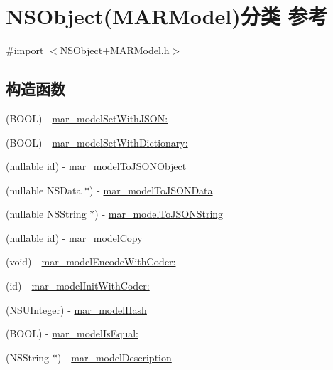 \hypertarget{category_n_s_object_07_m_a_r_model_08}{}\section{N\+S\+Object(M\+A\+R\+Model)分类 参考}
\label{category_n_s_object_07_m_a_r_model_08}


{\ttfamily \#import $<$N\+S\+Object+\+M\+A\+R\+Model.\+h$>$}

\subsection*{构造函数}
\begin{DoxyCompactItemize}
\item 
(B\+O\+OL) -\/ \hyperlink{category_n_s_object_07_m_a_r_model_08_a4c2e8b36fb2a53b588010cdff2b42e72}{mar\+\_\+model\+Set\+With\+J\+S\+O\+N\+:}
\item 
(B\+O\+OL) -\/ \hyperlink{category_n_s_object_07_m_a_r_model_08_ab4b927a12df81c4900b640ef2e3284b5}{mar\+\_\+model\+Set\+With\+Dictionary\+:}
\item 
(nullable id) -\/ \hyperlink{category_n_s_object_07_m_a_r_model_08_aeacba89acb57ff6cae02947236f16320}{mar\+\_\+model\+To\+J\+S\+O\+N\+Object}
\item 
(nullable N\+S\+Data $\ast$) -\/ \hyperlink{category_n_s_object_07_m_a_r_model_08_ae7ca0a3a8cca8713083703ab3fb0cf09}{mar\+\_\+model\+To\+J\+S\+O\+N\+Data}
\item 
(nullable N\+S\+String $\ast$) -\/ \hyperlink{category_n_s_object_07_m_a_r_model_08_a149bc95723a1d9662e8bb43de399b497}{mar\+\_\+model\+To\+J\+S\+O\+N\+String}
\item 
(nullable id) -\/ \hyperlink{category_n_s_object_07_m_a_r_model_08_a70ff93c534810af04782cf69a0c6c3fe}{mar\+\_\+model\+Copy}
\item 
(void) -\/ \hyperlink{category_n_s_object_07_m_a_r_model_08_a76390b4dcb9c4a67c04cdad1de52a5a1}{mar\+\_\+model\+Encode\+With\+Coder\+:}
\item 
(id) -\/ \hyperlink{category_n_s_object_07_m_a_r_model_08_a778d2e3b0d3682c72d00cf07baf50ec4}{mar\+\_\+model\+Init\+With\+Coder\+:}
\item 
(N\+S\+U\+Integer) -\/ \hyperlink{category_n_s_object_07_m_a_r_model_08_a6c12ed2844aedb064ef59f4e6abaca00}{mar\+\_\+model\+Hash}
\item 
(B\+O\+OL) -\/ \hyperlink{category_n_s_object_07_m_a_r_model_08_ae17b172f58052d3ad8eb25ca50353e2c}{mar\+\_\+model\+Is\+Equal\+:}
\item 
(N\+S\+String $\ast$) -\/ \hyperlink{category_n_s_object_07_m_a_r_model_08_a0cf32b800bc93bfcf4592b1115e4645e}{mar\+\_\+model\+Description}
\end{DoxyCompactItemize}
